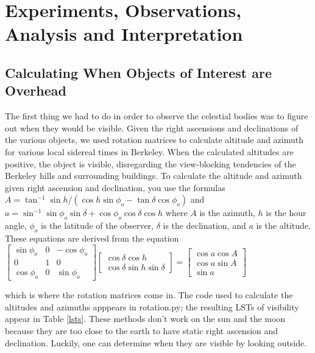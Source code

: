 \documentclass[11pt]{article}
\newcommand{\inv}{^{-1}}
\begin{document}
\section{Experiments, Observations, Analysis and Interpretation} 

\subsection{Calculating When Objects of Interest are Overhead}
The first thing we had to do in order to observe the celestial bodies was to figure out when they would be visible. Given the right ascensions and declinations of the various objects, we used rotation matrices to calculate altitude and azimuth for various local sidereal times in Berkeley. When the calculated altitudes are positive, the object is visible, disregarding the view-blocking tendencies of the Berkeley hills and surrounding buildings. To calculate the altitude and azimuth given right ascension and declination, you use the formulas $A = \tan\inv{\sin{h}/(\cos{h}\sin{\phi_o} - \tan{\delta}\cos{\phi_o})}$ and $a = \sin\inv{\sin{\phi_o}\sin{\delta} + \cos{\phi_o}\cos{\delta}\cos{h}}$ where $A$ is the azimuth, $h$ is the hour angle, $\phi_o$ is the latitude of the observer, $\delta$ is the declination, and $a$ is the altitude. These equations are derived from the equation 
$\begin{bmatrix}
\sin{\phi_o} & 0 & -\cos{\phi_o} \\
0 & 1 & 0 \\
\cos{\phi_o} & 0 & \sin{\phi_o}
\end{bmatrix}
\begin{bmatrix}
\cos{\delta}\cos{h} \\
\cos{\delta}\sin{h}
\sin{\delta}
\end{bmatrix}
=
\begin{bmatrix} 
\cos{a}\cos{A} \\
\cos{a}\sin{A} \\
\sin{a}
\end{bmatrix}$

which is where the rotation matrices come in. The code used to calculate the altitudes and azimuths apppears in rotation.py; the resulting LSTs of visibility appear in Table \ref{lsts}. These methods don't work on the sun and the moon because they are too close to the earth to have static right ascension and declination. Luckily, one can determine when they are visible by looking outside.
\end{document}
